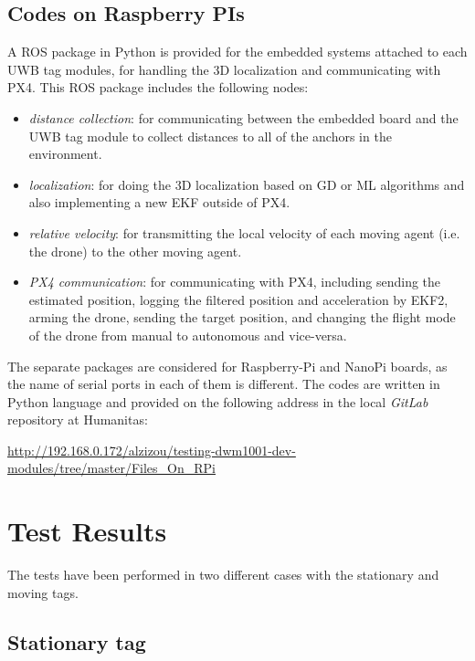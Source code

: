 \documentclass{article}
\begin{document}
\subsection{Codes on Raspberry PIs}
A ROS package in Python is provided for the embedded systems attached to each UWB tag modules, for handling the 3D localization and communicating with PX4. This ROS package includes the following nodes:
\begin{itemize}
    \item \textit{distance collection}: for communicating between the embedded board and the UWB tag module to collect distances to all of the anchors in the environment.
    \item \textit{localization}: for doing the 3D localization based on GD or ML algorithms and also implementing a new EKF outside of PX4.
    \item \textit{relative velocity}: for transmitting the local velocity of each moving agent (i.e. the drone) to the other moving agent.
    \item \textit{PX4 communication}: for communicating with PX4, including sending the estimated position, logging the filtered position and acceleration by EKF2, arming the drone, sending the target position, and changing the flight mode of the drone from manual to autonomous and vice-versa.
\end{itemize}

The separate packages are considered for Raspberry-Pi and NanoPi boards, as the name of serial ports in each of them is different.
The codes are written in Python language and provided on the following address in the local \textit{GitLab} repository at Humanitas:

\url{http://192.168.0.172/alzizou/testing-dwm1001-dev-modules/tree/master/Files_On_RPi}

\newpage
\section{Test Results}
The tests have been performed in two different cases with the stationary and moving tags.

\subsection{Stationary tag}
\end{document}
